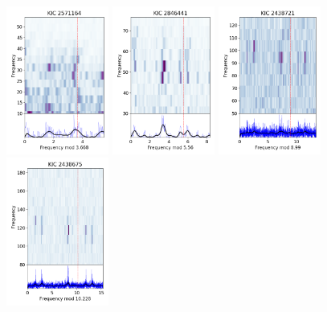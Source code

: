 \begin{figure}
    \centering
        \includegraphics[width=0.3\textwidth]{Chapter5/2571164_echelle.png}
        \includegraphics[width=0.3\textwidth]{Chapter5/2846441_echelle.png}
        \includegraphics[width=0.3\textwidth]{Chapter5/2438721_echelle.png}
        \includegraphics[width=0.3\textwidth]{Chapter5/2438675_echelle.png}

\end{figure}
